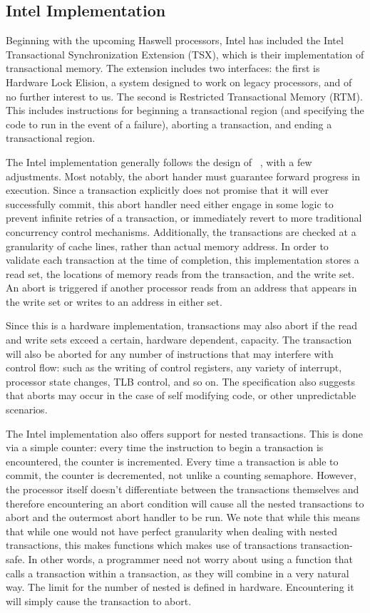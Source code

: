 \documentclass{acm_proc_article-sp}
\begin{document}
\subsection{Intel Implementation}

Beginning with the upcoming Haswell processors, Intel has included the Intel Transactional
Synchronization Extension (TSX), which is their implementation of transactional
memory. The extension includes two interfaces: the first is Hardware Lock
Elision, a system designed to work on legacy processors, and of no further
interest to us. The second is Restricted Transactional Memory (RTM). This 
includes instructions for beginning a transactional region (and specifying the
code to run in the event of a failure), aborting a transaction, and ending a 
transactional region. \cite{intelsys, intelblog}

The Intel implementation generally follows the design of 
~\cite{Herlihy:1993:TMA:173682.165164}, with a few adjustments.
Most notably, the abort hander must guarantee forward progress in 
execution. Since a transaction explicitly does not promise that it will 
ever successfully commit, this abort handler need either engage in some
logic to prevent infinite retries of a transaction, or immediately revert to more
traditional concurrency control mechanisms. 
Additionally, the transactions are checked at a granularity of cache lines, 
rather than actual memory address. In order to validate each transaction at the
time of completion, this implementation stores a read set, the locations of
memory reads from the transaction, and the write set. An abort is triggered
if another processor reads from an address that appears in the write set or 
writes to an address in either set.

Since this is a hardware implementation, transactions may also abort if the 
read and write sets exceed a certain, hardware dependent, capacity. The 
transaction will also be aborted for any number of instructions that may 
interfere with control flow: such as the writing of control registers, any 
variety of interrupt, processor state changes, TLB control, and so on. The 
specification also suggests that aborts may occur in the case of self modifying
code, or other unpredictable scenarios.

The Intel implementation also offers support for nested transactions. 
This is done via a simple counter: every time the instruction to begin a
transaction is encountered, the counter is incremented. Every time a 
transaction is able to commit, the counter is decremented, not unlike a
counting semaphore. However, the processor itself doesn't differentiate 
between the transactions themselves and therefore encountering an abort
condition will cause all the nested transactions to abort and the
outermost abort handler to be run. We note that while this means that
while one would not have perfect granularity when dealing with nested 
transactions, this makes functions which makes use of transactions
transaction-safe. In other words, a programmer need not worry about using 
a function that calls a transaction within a transaction, as they will
combine in a very natural way. The limit for the number of nested 
is defined in hardware. Encountering it will simply cause the transaction
to abort.
\end{document}
